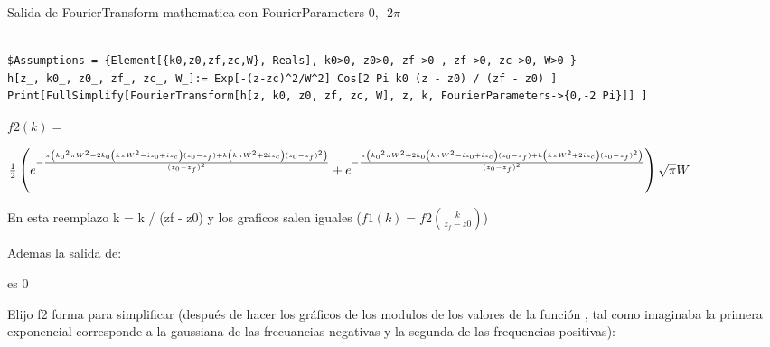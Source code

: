 \documentclass{article}
\begin{document}
Salida de FourierTransform mathematica con FourierParameters 0, -2$\pi$ 

\begin{verbatim}

$Assumptions = {Element[{k0,z0,zf,zc,W}, Reals], k0>0, z0>0, zf >0 , zf >0, zc >0, W>0 }
h[z_, k0_, z0_, zf_, zc_, W_]:= Exp[-(z-zc)^2/W^2] Cos[2 Pi k0 (z - z0) / (zf - z0) ]
Print[FullSimplify[FourierTransform[h[z, k0, z0, zf, zc, W], z, k, FourierParameters->{0,-2 Pi}]] ]

\end{verbatim}
$f2(k)=$

$\frac{1}{2} \left(e^{-\frac{\pi  \left(\text{$k_0$}^2 \pi  W^2-2 \text{$k_0$} \left(k \pi  W^2-i \text{$z_0$}+i \text{$z_c$}\right) (\text{$z_0$}-\text{$z_f$})+k
\left(k \pi  W^2+2 i \text{$z_c$}\right) (\text{$z_0$}-\text{$z_f$})^2\right)}{(\text{$z_0$}-\text{$z_f$})^2}}+ \\
e^{-\frac{\pi  \left(\text{$k_0$}^2 \pi  W^2+2 \text{$k_0$}
\left(k \pi  W^2-i \text{$z_0$}+i \text{$z_c$}\right) (\text{$z_0$}-\text{$z_f$})+k \left(k \pi  W^2+2 i \text{$z_c$}\right) (\text{$z_0$}-\text{$z_f$})^2\right)}{(\text{$z_0$}-\text{$z_f$})^2}}\right)
\sqrt{\pi } W$

En esta reemplazo k = k / (zf - z0) y los graficos salen iguales ($f1(k) = f2(\frac{k}{z_f - z0})$)


Ademas la salida de:

es 0


Elijo f2 forma para simplificar (después de hacer los gráficos de los modulos de los valores de la función , tal como imaginaba la primera exponencial corresponde a la gaussiana de las frecuancias negativas y la segunda de las frequencias positivas):
\end{document}
